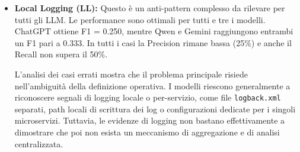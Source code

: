 \begin{itemize}
    Inoltre, si specifica che questo è uno di quei casi dove può palesarsi una discrepanza con il GT dovuta ad ipotetici errori o ambiguità in quest'ultimo.
    
    Infine, questo è uno degli anti-pattern che, durante i test preliminari, ha beneficiato positivamente della revisione della definizione, con un miglioramento della detection e una riduzione degli errori.

    \begin{tcolorbox}[
    title=\textbf{Indicatori tipici per rilevare l'anti-pattern Timeout},
    colback=blue!3!white,
    colframe=blue!55!black,
    coltitle=white,
    fonttitle=\bfseries,
    enhanced,
    breakable,
    arc=2mm,
    boxrule=0.8pt
]

I modelli tendono a segnalare l'anti-pattern quando trovano valori o configurazioni esplicite di timeout applicate alle chiamate tra microservizi:

\vspace{2mm}

\begin{itemize}[leftmargin=*]
    \item configurazioni con valori fissi di timeout, ad esempio \texttt{timeout}, \texttt{connectTimeout}, \texttt{readTimeout} o \texttt{ReadTimeout};
    \item configurazioni di retry o timeout nelle chiamate HTTP/RPC tra servizi;
    \item script o wrapper di deployment che attendono una connessione per un tempo massimo, ad esempio con opzioni come \texttt{--timeout}.
\end{itemize}

\end{tcolorbox}

    \item \textbf{Local Logging (LL):}  Questo è un anti-pattern complesso da rilevare per tutti gli LLM. Le performance sono ottimali per tutti e tre i modelli. ChatGPT ottiene F1 = 0.250, mentre Qwen e Gemini raggiungono entrambi un F1 pari a 0.333. In tutti i casi la Precision rimane bassa (25\%) e anche il Recall non supera il 50\%.

    L'analisi dei casi errati mostra che il problema principale risiede nell'ambiguità della definizione operativa. I modelli riescono generalmente a riconoscere segnali di logging locale o per-servizio, come file \texttt{logback.xml} separati, path locali di scrittura dei log o configurazioni dedicate per i singoli microservizi. Tuttavia, le evidenze di logging non bastano effettivamente a dimostrare che poi non esista un meccanismo di aggregazione e di analisi centralizzata. 
    

\end{itemize}
